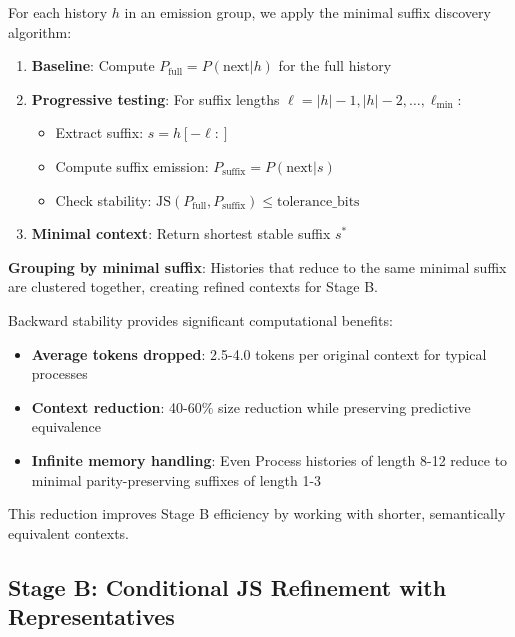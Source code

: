 \documentclass[11pt]{article}
\begin{document}
\begin{resultbox}
For each history $h$ in an emission group, we apply the minimal suffix discovery algorithm:

\begin{enumerate}
\item \textbf{Baseline}: Compute $P_{\text{full}} = P(\text{next}|h)$ for the full history
\item \textbf{Progressive testing}: For suffix lengths $\ell = |h|-1, |h|-2, \ldots, \ell_{\min}$:
   \begin{itemize}
   \item Extract suffix: $s = h[-\ell:]$
   \item Compute suffix emission: $P_{\text{suffix}} = P(\text{next}|s)$
   \item Check stability: $\text{JS}(P_{\text{full}}, P_{\text{suffix}}) \leq \text{tolerance\_bits}$
   \end{itemize}
\item \textbf{Minimal context}: Return shortest stable suffix $s^*$
\end{enumerate}

\textbf{Grouping by minimal suffix}: Histories that reduce to the same minimal suffix are clustered together, creating refined contexts for Stage B.
\end{resultbox}

\begin{notebox}
Backward stability provides significant computational benefits:
\begin{itemize}
\item \textbf{Average tokens dropped}: 2.5-4.0 tokens per original context for typical processes
\item \textbf{Context reduction}: 40-60\% size reduction while preserving predictive equivalence
\item \textbf{Infinite memory handling}: Even Process histories of length 8-12 reduce to minimal parity-preserving suffixes of length 1-3
\end{itemize}

This reduction improves Stage B efficiency by working with shorter, semantically equivalent contexts.
\end{notebox}

\subsection{Stage B: Conditional JS Refinement with Representatives}
\end{document}
